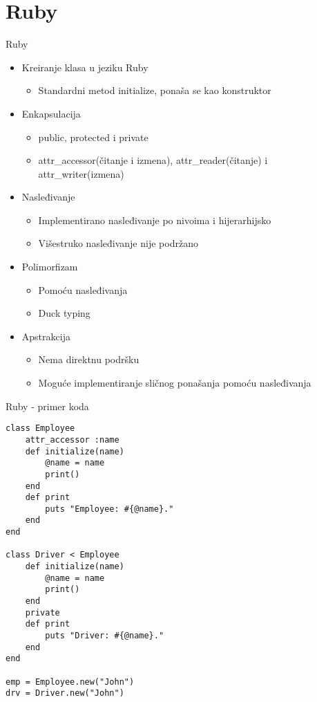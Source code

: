 \documentclass[14pt,aspectratio=169]{beamer}
\begin{document}
\section{Ruby}
\begin{frame}[fragile]{Ruby}
\begin{itemize}
	\item Kreiranje klasa u jeziku Ruby
	\begin{itemize}
		\item Standardni metod initialize, ponaša se kao konstruktor
	\end{itemize}
	\item Enkapsulacija
	\begin{itemize}
		\item public, protected i private
		\item attr\_accessor(čitanje i izmena), attr\_reader(čitanje) i attr\_writer(izmena)
	\end{itemize}
	\item Nasleđivanje
	\begin{itemize}
		\item Implementirano nasleđivanje po nivoima i hijerarhijsko
		\item Višestruko nasleđivanje nije podržano
	\end{itemize}
	\item Polimorfizam
	\begin{itemize}
		\item Pomoću nasleđivanja
		\item Duck typing
	\end{itemize}
	\item Apstrakcija
	\begin{itemize}
		\item Nema direktnu podršku
		\item Moguće implementiranje sličnog ponašanja pomoću nasleđivanja
	\end{itemize}
\end{itemize}
\end{frame}

\begin{frame}[fragile]{Ruby \small{- primer koda}}
\begin{lstlisting}[frame=single, label=lst:rubyDeklaracija]
class Employee
	attr_accessor :name
	def initialize(name)
		@name = name
		print()
	end
	def print
		puts "Employee: #{@name}."
	end
end

class Driver < Employee
	def initialize(name)
		@name = name
		print()
	end
	private
	def print
		puts "Driver: #{@name}."
	end
end

emp = Employee.new("John")
drv = Driver.new("John")
\end{lstlisting}
\end{frame}
\end{document}
